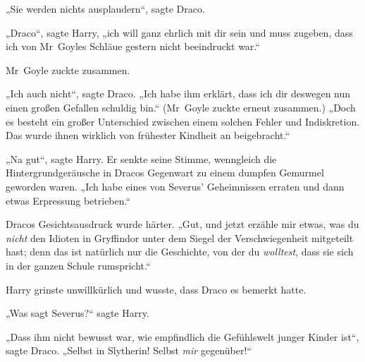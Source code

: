 „Sie werden nichts ausplaudern“, sagte Draco.

„Draco“, sagte Harry, „ich will ganz ehrlich mit dir sein und muss zugeben, dass ich von Mr~Goyles Schläue gestern nicht beeindruckt war.“

Mr~Goyle zuckte zusammen.

„Ich auch nicht“, sagte Draco.
„Ich habe ihm erklärt, dass ich dir deswegen nun einen großen Gefallen schuldig bin.“ (Mr~Goyle zuckte erneut zusammen.)
„Doch es besteht ein großer Unterschied zwischen einem solchen Fehler und Indiskretion. Das wurde ihnen wirklich von frühester Kindheit an beigebracht.“

„Na gut“, sagte Harry. Er senkte seine Stimme, wenngleich die Hintergrundgeräusche in Dracos Gegenwart zu einem dumpfen Gemurmel geworden waren.
„Ich habe eines von Severus’ Geheimnissen erraten und dann etwas Erpressung betrieben.“

Dracos Gesichtsausdruck wurde härter.
„Gut, und jetzt erzähle mir etwas, was du \emph{nicht} den Idioten in Gryffindor unter dem Siegel der Verschwiegenheit mitgeteilt hast; denn das ist natürlich nur die Geschichte, von der du \emph{wolltest}, dass sie sich in der ganzen Schule rumspricht.“

Harry grinste unwillkürlich und wusste, dass Draco es bemerkt hatte.

„Was sagt Severus?“ sagte Harry.

„Dass ihm nicht bewusst war, wie empfindlich die Gefühlswelt junger Kinder ist“, sagte Draco.
„Selbst in Slytherin! Selbst \emph{mir} gegenüber!“

